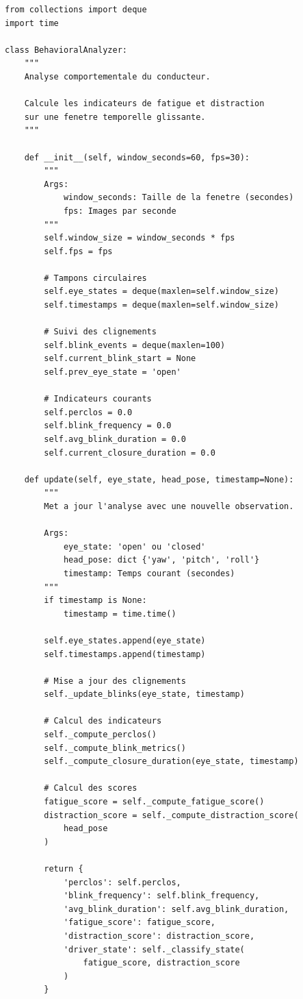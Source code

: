 \documentclass[12pt,a4paper,twoside]{report}
\begin{document}
\begin{lstlisting}[style=pythonstyle, caption={Module d'analyse comportementale.}, label={lst:behavioral}]
from collections import deque
import time

class BehavioralAnalyzer:
    """
    Analyse comportementale du conducteur.
    
    Calcule les indicateurs de fatigue et distraction
    sur une fenetre temporelle glissante.
    """
    
    def __init__(self, window_seconds=60, fps=30):
        """
        Args:
            window_seconds: Taille de la fenetre (secondes)
            fps: Images par seconde
        """
        self.window_size = window_seconds * fps
        self.fps = fps
        
        # Tampons circulaires
        self.eye_states = deque(maxlen=self.window_size)
        self.timestamps = deque(maxlen=self.window_size)
        
        # Suivi des clignements
        self.blink_events = deque(maxlen=100)
        self.current_blink_start = None
        self.prev_eye_state = 'open'
        
        # Indicateurs courants
        self.perclos = 0.0
        self.blink_frequency = 0.0
        self.avg_blink_duration = 0.0
        self.current_closure_duration = 0.0
    
    def update(self, eye_state, head_pose, timestamp=None):
        """
        Met a jour l'analyse avec une nouvelle observation.
        
        Args:
            eye_state: 'open' ou 'closed'
            head_pose: dict {'yaw', 'pitch', 'roll'}
            timestamp: Temps courant (secondes)
        """
        if timestamp is None:
            timestamp = time.time()
        
        self.eye_states.append(eye_state)
        self.timestamps.append(timestamp)
        
        # Mise a jour des clignements
        self._update_blinks(eye_state, timestamp)
        
        # Calcul des indicateurs
        self._compute_perclos()
        self._compute_blink_metrics()
        self._compute_closure_duration(eye_state, timestamp)
        
        # Calcul des scores
        fatigue_score = self._compute_fatigue_score()
        distraction_score = self._compute_distraction_score(
            head_pose
        )
        
        return {
            'perclos': self.perclos,
            'blink_frequency': self.blink_frequency,
            'avg_blink_duration': self.avg_blink_duration,
            'fatigue_score': fatigue_score,
            'distraction_score': distraction_score,
            'driver_state': self._classify_state(
                fatigue_score, distraction_score
            )
        }
    

\end{lstlisting}
\end{document}
